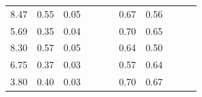 \begin{refsection}[referencesCh3]
\begin{table}
\begin{adjustbox}{scale=0.8,center}
\begin{tabular}{@{}ccccccccccc@{}}
		8.47                                                         & 0.55                                                & 0.05                                                &                                                     &                                                     &                                                      & 0.67                                                & 0.56                                                  &                                                         &                                                      & \cite{ADAS}            \\
		5.69                                                         & 0.35                                                & 0.04                                                &                                                     &                                                     &                                                      & 0.70                                                & 0.65                                                  &                                                         &                                                      & \cite{ADAS}            \\
		8.30                                                         & 0.57                                                & 0.05                                                &                                                     &                                                     &                                                      & 0.64                                                & 0.50                                                  &                                                         &                                                      & \cite{ADAS}            \\
		6.75                                                         & 0.37                                                & 0.03                                                &                                                     &                                                     &                                                      & 0.57                                                & 0.64                                                  &                                                         &                                                      & \cite{ADAS}           \\
		3.80                                                         & 0.40                                                & 0.03                                                &                                                     &                                                     &                                                      & 0.70                                                & 0.67                                                  &                                                         &                                                      & \cite{ADAS}            \\

\end{tabular}
\end{adjustbox}
\end{table}
\end{refsection}
